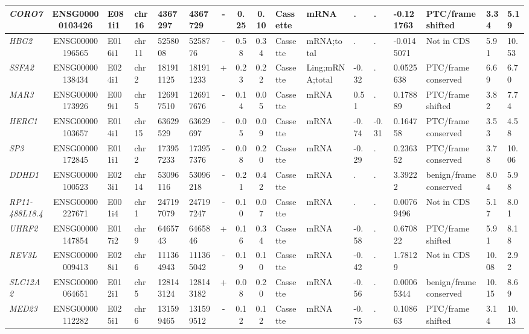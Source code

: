 \begin{appendices}
\begin{landscape}
\begin{table}
{\begin{tabular}{|l|c|l|l|l|l|c|c|c|l|l|l|l|l|l|l|l|}
		\textit{CORO7} & ENSG00000103426 & E081i1 & chr16 & 4367297 & 4367729 & -     & 0.25  & 0.10  & Cassette & mRNA  & . & . & -0.121763 & PTC/frame shifted & 3.34  &  5.19 \\ \hline
		\textit{HBG2} & ENSG00000196565 & E016i1 & chr11 & 5258008 & 5258776 & -     & 0.58  & 0.34  & Cassette & mRNA;total & . & . & -0.0145071 & Not in CDS     & 5.91  &  10.53 \\ \hline
		\textit{SSFA2} & ENSG00000138434 & E024i1 & chr2  & 181911125 & 181911233 & +     & 0.23  & 0.22  & Cassette & Ling;mRNA;total & -0.32 & . & 0.0525638 & PTC/frame conserved & 6.69  &  6.70 \\ \hline
		\textit{MAR3} & ENSG00000173926 & E009i1 & chr5  & 126917510 & 126917676 & -     & 0.14  & 0.05  & Cassette & mRNA  & 0.51  & . & 0.178889 & PTC/frame shifted & 3.82  &  7.74 \\ \hline
		\textit{HERC1} & ENSG00000103657 & E014i1 & chr15 & 63629529 & 63629697 & -     & 0.05  & 0.09  & Cassette & mRNA  & -0.74 & -0.31 & 0.164758 & PTC/frame conserved & 3.53  &  4.58 \\ \hline
		\textit{SP3} & ENSG00000172845 & E011i1 & chr2  & 173957233 & 173957376 & -     & 0.08  & 0.20  & Cassette & mRNA  & -0.29 & . & 0.236352 & PTC/frame conserved & 3.78  &  10.06 \\ \hline
		\textit{DDHD1} & ENSG00000100523 & E023i1 & chr14 & 53096116 & 53096218 & -     & 0.21  & 0.42  & Cassette & mRNA  & . & . & 3.39222 & benign/frame conserved & 8.04  &  5.98 \\ \hline
		\textit{RP11-488L18.4} & ENSG00000227671 & E001i4 & chr1  & 247197079 & 247197247 & -     & 0.10  & 0.07  & Cassette & mRNA  & . & . & 0.00769496 & Not in CDS     & 5.17  &  8.01 \\ \hline
		\textit{UHRF2} & ENSG00000147854 & E017i2 & chr9  & 6465743 & 6465846 & +     & 0.16  & 0.34  & Cassette & mRNA  & -0.58 & . & 0.670822 & PTC/frame shifted & 5.91  &  8.18 \\ \hline
		\textit{REV3L} & ENSG00000009413 & E028i1 & chr6  & 111364943 & 111365042 & -     & 0.19  & 0.10  & Cassette & mRNA  & -0.42 & . & 1.78129 & Not in CDS    & 10.08 &  2.92 \\ \hline
		\textit{SLC12A2} & ENSG00000064651 & E012i1 & chr5  & 128143124 & 128143182 & +     & 0.08  & 0.20  & Cassette & mRNA  & -0.56 & . & 0.00065344 & benign/frame conserved & 10.15 &  8.69 \\ \hline
		\textit{MED23} & ENSG00000112282 & E025i1 & chr6  & 131599465 & 131599512 & -     & 0.12  & 0.12  & Cassette & mRNA  & -0.75 & . & 0.108663 & PTC/frame shifted & 3.14  &  10.13 \\ \hline

\end{tabular}}
\end{table}
\end{landscape}
\end{appendices}
